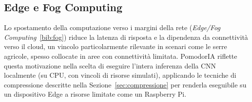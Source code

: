 \subsection{Edge e Fog Computing}

Lo spostamento della computazione verso i margini della rete
(\emph{Edge/Fog Computing}~\ref{bib:fog}) riduce la latenza di risposta e
la dipendenza da connettività verso il cloud, un vincolo particolarmente
rilevante in scenari come le serre agricole, spesso collocate in aree con
connettività limitata. PomodorIA riflette questa motivazione nella scelta
di eseguire l'intera inferenza della CNN localmente (su CPU, con vincoli di
risorse simulati), applicando le tecniche di compressione descritte nella
Sezione~\ref{sec:compressione} per renderla eseguibile su un dispositivo
Edge a risorse limitate come un Raspberry Pi.

